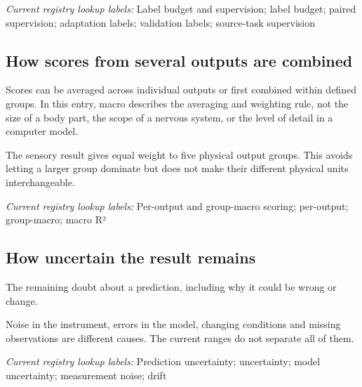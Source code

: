 \noindent\textit{Current registry lookup labels:} Label budget and supervision; label budget; paired supervision; adaptation labels; validation labels; source-task supervision\par

\begin{samepage}
\subsection*{How scores from several outputs are combined}
\noindent Scores can be averaged across individual outputs or first combined within defined groups. In this entry, macro describes the averaging and weighting rule, not the size of a body part, the scope of a nervous system, or the level of detail in a computer model.\par
\end{samepage}
\begin{samepage}
\noindent The sensory result gives equal weight to five physical output groups. This avoids letting a larger group dominate but does not make their different physical units interchangeable.\par\nopagebreak[4]

\end{samepage}


\noindent\textit{Current registry lookup labels:} Per-output and group-macro scoring; per-output; group-macro; macro R²\par

\begin{samepage}
\subsection*{How uncertain the result remains}
\noindent The remaining doubt about a prediction, including why it could be wrong or change.\par
\end{samepage}
\begin{samepage}
\noindent Noise in the instrument, errors in the model, changing conditions and missing observations are different causes. The current ranges do not separate all of them.\par\nopagebreak[4]

\end{samepage}


\noindent\textit{Current registry lookup labels:} Prediction uncertainty; uncertainty; model uncertainty; measurement noise; drift\par

